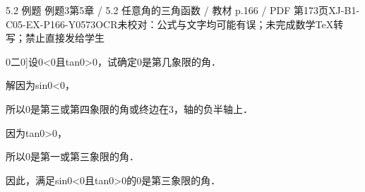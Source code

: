 \begin{bankitem}{5.2 例题 例题3}{第5章 / 5.2 任意角的三角函数 / 教材 p.166 / PDF 第173页}{XJ-B1-C05-EX-P166-Y0573}{OCR未校对：公式与文字均可能有误；未完成数学TeX转写；禁止直接发给学生}
\begin{ocrdraft}
\par
0二0]设0<0且tan0>0，试确定0是第几象限的角．
\par
解因为sin0<0，
\par
所以0是第三或第四象限的角或终边在3，轴的负半轴上．
\par
因为tan0>0，
\par
所以0是第一或第三象限的角．
\par
因此，满足sin0<0且tan0>0的0是第三象限的角．
\end{ocrdraft}
\end{bankitem}

